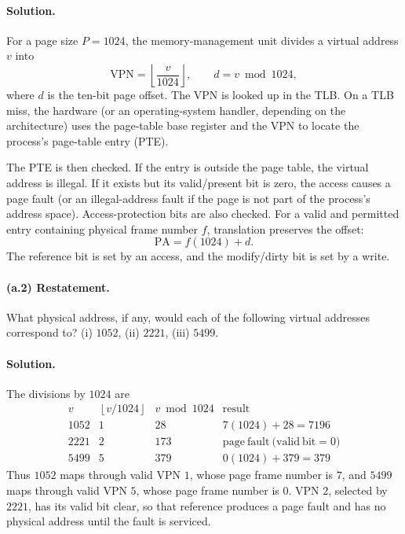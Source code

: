\paragraph{Solution.}
For a page size \(P=1024\), the memory-management unit divides a virtual
address \(v\) into
\[
 \mathrm{VPN}=\left\lfloor\frac{v}{1024}\right\rfloor,
 \qquad
 d=v\bmod 1024,
\]
where \(d\) is the ten-bit page offset.  The VPN is looked up in the
TLB.  On a TLB miss, the hardware (or an operating-system handler,
depending on the architecture) uses the page-table base register and
the VPN to locate the process's page-table entry (PTE).

The PTE is then checked.  If the entry is outside the page table, the
virtual address is illegal.  If it exists but its valid/present bit is
zero, the access causes a page fault (or an illegal-address fault if the
page is not part of the process's address space).  Access-protection
bits are also checked.  For a valid and permitted entry containing
physical frame number \(f\), translation preserves the offset:
\[
 \mathrm{PA}=f(1024)+d.
\]
The reference bit is set by an access, and the modify/dirty bit is set
by a write.

\paragraph{(a.2) Restatement.}
What physical address, if any, would each of the following virtual
addresses correspond to?  (i) \(1052\), (ii) \(2221\), (iii) \(5499\).

\paragraph{Solution.}
The divisions by \(1024\) are
\[
\begin{array}{c|c|c|c}
v & \left\lfloor v/1024\right\rfloor & v\bmod 1024 & \mathrm{result}\\ \hline
1052 & 1 & 28 & 7(1024)+28=7196\\
2221 & 2 & 173 & \mathrm{page\ fault\ (valid\ bit}=0)\\
5499 & 5 & 379 & 0(1024)+379=379
\end{array}
\]
Thus \(1052\) maps through valid VPN \(1\), whose page frame number is
\(7\), and \(5499\) maps through valid VPN \(5\), whose page frame
number is \(0\).  VPN \(2\), selected by \(2221\), has its valid bit
clear, so that reference produces a page fault and has no physical
address until the fault is serviced.

